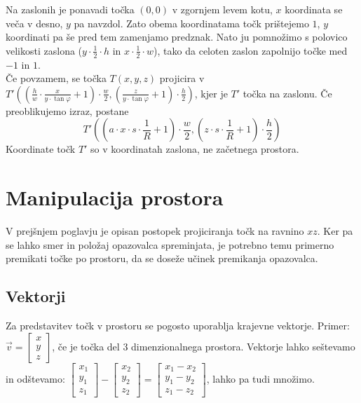 \documentclass[a4paper, 12px]{article}
\begin{document}
    Na zaslonih je ponavadi točka $\left(0, 0\right)$ v zgornjem levem kotu, $x$ koordinata se veča v desno, $y$ pa navzdol.
    Zato obema koordinatama točk prištejemo $1$, $y$ koordinati pa še pred tem zamenjamo predznak.
    Nato ju pomnožimo s polovico velikosti zaslona ($y \cdot \frac{1}{2} \cdot h$ in $x \cdot \frac{1}{2} \cdot w$), tako da celoten zaslon zapolnijo točke med $-1$ in $1$. \\

    Če povzamem, se točka $T\left(x, y, z\right)$ projicira v 
    $T'\left(\left(\frac{h}{w} \cdot \frac{x}{y \cdot \tan{\varphi}} + 1\right) \cdot \frac{w}{2},
    \left(\frac{z}{y \cdot \tan{\varphi}} + 1\right) \cdot \frac{h}{2} \right)$, 
    kjer je $T'$ točka na zaslonu. Če preoblikujemo izraz, postane 
    $$T'\left(\left(a \cdot x \cdot s \cdot \frac{1}{R} + 1\right) \cdot \frac{w}{2},
    \left(z \cdot s \cdot \frac{1}{R} + 1\right) \cdot \frac{h}{2} \right)$$
    Koordinate točk $T'$ so v koordinatah zaslona, ne začetnega prostora.
    \cite{ProjectionVideo}

\section{Manipulacija prostora}
    V prejšnjem poglavju je opisan postopek projiciranja točk na ravnino $xz$.
    Ker pa se lahko smer in položaj opazovalca spreminjata, je potrebno temu primerno premikati
    točke po prostoru, da se doseže učinek premikanja opazovalca.
\subsection{Vektorji}
    Za predstavitev točk v prostoru se pogosto uporablja krajevne vektorje. Primer:
    $\vec{v}=\begin{bmatrix}
        x \\ y \\ z
    \end{bmatrix}$, če je točka del 3 dimenzionalnega prostora. Vektorje lahko seštevamo in odštevamo:
    $\begin{bmatrix}
        x_1 \\ y_1 \\ z_1
    \end{bmatrix} - \begin{bmatrix}
        x_2 \\ y_2 \\ z_2
    \end{bmatrix} = \begin{bmatrix}
        x_1 - x_2 \\ y_1 - y_2 \\ z_1 - z_2
    \end{bmatrix}$, lahko pa tudi množimo. \\
\end{document}

